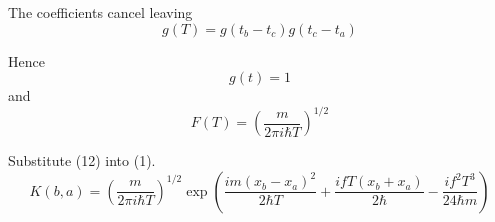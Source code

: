 \documentclass[12pt]{article}
\begin{document}
The coefficients cancel leaving
\begin{equation*}
g(T)=g(t_b-t_c)g(t_c-t_a)
\tag{11}
\end{equation*}

Hence
\begin{equation*}
g(t)=1
\end{equation*}
and
\begin{equation*}
F(T)=\left(\frac{m}{2\pi i\hbar T}\right)^{1/2}
\tag{12}
\end{equation*}

Substitute (12) into (1).
\begin{equation*}
K(b,a)=\left(\frac{m}{2\pi i\hbar T}\right)^{1/2}
\exp\left(
\frac{im(x_b-x_a)^2}{2\hbar T}
+\frac{ifT(x_b+x_a)}{2\hbar}
-\frac{if^2T^3}{24\hbar m}
\right)
\end{equation*}
\end{document}
